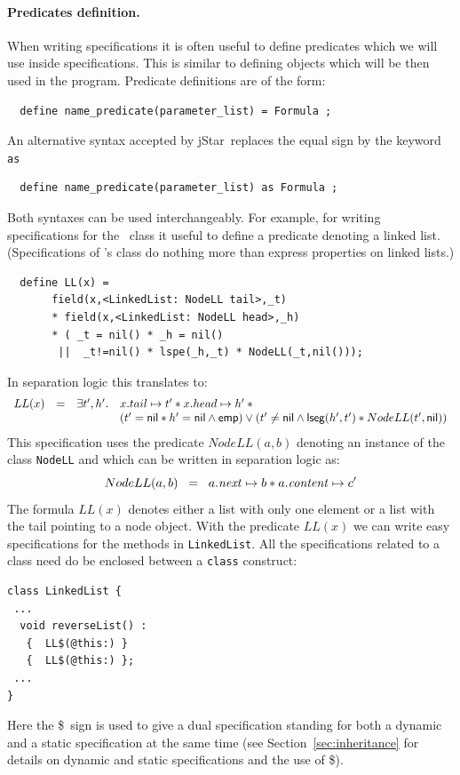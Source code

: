 \documentclass[11pt]{article}
\newcommand{\jStar}{{\sf jStar}}
\newcommand{\psto}{\mapsto}
\newcommand{\emp}{{\sf emp}}
\newcommand{\lseg}{{\sf lseg}}
\newcommand{\nil}{{\sf nil}}
\newcommand{\dollar}{\mbox{\$}}
\begin{document}
\paragraph{Predicates definition.}
When writing specifications it is often useful to define predicates
which we will use inside specifications. This is similar to defining
objects which will be then used in the program. Predicate definitions
are of the form:
\begin{verbatim}
  define name_predicate(parameter_list) = Formula ;
\end{verbatim}
An alternative syntax accepted by \jStar \ replaces the equal sign by the keyword {\tt as}
\begin{verbatim}
  define name_predicate(parameter_list) as Formula ;
\end{verbatim}
Both syntaxes can be used interchangeably.
For example, for writing specifications for the \linkedlist \ class it
useful to define a predicate denoting a linked list. (Specifications of \linkedlist's class do nothing more than express
properties on linked lists.)
\begin{verbatim}
  define LL(x) =  
       field(x,<LinkedList: NodeLL tail>,_t) 
       * field(x,<LinkedList: NodeLL head>,_h) 
       * ( _t = nil() * _h = nil() 
        ||  _t!=nil() * lspe(_h,_t) * NodeLL(_t,nil())); 
\end{verbatim}
%
In separation logic this translates to:
\[\begin{array}{llll}
 LL(x) & = &  \exists t',h' \ldotp  &x.tail \psto t' * x.head \psto h' * {}
\\
& & & (t'=\nil * h'=\nil \wedge \emp ) 
\vee 
(t' \neq \nil \wedge \lseg(h',t') *NodeLL(t',\nil) )  
\end{array}
\]
This specification uses the predicate $NodeLL(a,b)$ denoting an instance of the class {\tt NodeLL}
and which can be written in separation logic as:
\[
  NodeLL(a,b) \;\; = \;\; a.{\it next} \psto b * a.{\it content} \psto c' 
\]
The formula
$LL(x)$ denotes either a list with only one element or a list with
the tail pointing to a node object. With the predicate $LL(x)$ we can
write easy specifications for the methods in {\tt LinkedList}.
All the specifications related to a class need do be enclosed between
a {\tt class} construct:
\begin{verbatim}
class LinkedList {
 ...
  void reverseList() : 
   {  LL$(@this:) } 
   {  LL$(@this:) };
 ...
}
\end{verbatim}
Here the \dollar \ sign is used to give a dual specification standing for both a dynamic and a static specification at the same time (see Section~\ref{sec:inheritance} for details on dynamic and static specifications and the use of \dollar).
\end{document}
